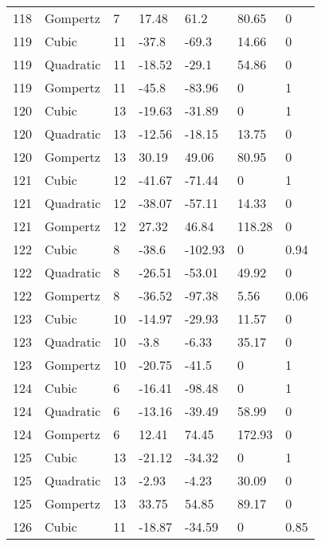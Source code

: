 \documentclass[11pt]{article}
\begin{document}
\begin{center}
\begin{longtable}{lllllll}
    118 & Gompertz  & 7               & 17.48   & 61.2    & 80.65   & 0    \\
    119 & Cubic     & 11              & -37.8   & -69.3   & 14.66   & 0    \\
    119 & Quadratic & 11              & -18.52  & -29.1   & 54.86   & 0    \\
    119 & Gompertz  & 11              & -45.8   & -83.96  & 0       & 1    \\
    120 & Cubic     & 13              & -19.63  & -31.89  & 0       & 1    \\
    120 & Quadratic & 13              & -12.56  & -18.15  & 13.75   & 0    \\
    120 & Gompertz  & 13              & 30.19   & 49.06   & 80.95   & 0    \\
    121 & Cubic     & 12              & -41.67  & -71.44  & 0       & 1    \\
    121 & Quadratic & 12              & -38.07  & -57.11  & 14.33   & 0    \\
    121 & Gompertz  & 12              & 27.32   & 46.84   & 118.28  & 0    \\
    122 & Cubic     & 8               & -38.6   & -102.93 & 0       & 0.94 \\
    122 & Quadratic & 8               & -26.51  & -53.01  & 49.92   & 0    \\
    122 & Gompertz  & 8               & -36.52  & -97.38  & 5.56    & 0.06 \\
    123 & Cubic     & 10              & -14.97  & -29.93  & 11.57   & 0    \\
    123 & Quadratic & 10              & -3.8    & -6.33   & 35.17   & 0    \\
    123 & Gompertz  & 10              & -20.75  & -41.5   & 0       & 1    \\
    124 & Cubic     & 6               & -16.41  & -98.48  & 0       & 1    \\
    124 & Quadratic & 6               & -13.16  & -39.49  & 58.99   & 0    \\
    124 & Gompertz  & 6               & 12.41   & 74.45   & 172.93  & 0    \\
    125 & Cubic     & 13              & -21.12  & -34.32  & 0       & 1    \\
    125 & Quadratic & 13              & -2.93   & -4.23   & 30.09   & 0    \\
    125 & Gompertz  & 13              & 33.75   & 54.85   & 89.17   & 0    \\
    126 & Cubic     & 11              & -18.87  & -34.59  & 0       & 0.85 \\

\end{longtable}
\end{center}
\end{document}
